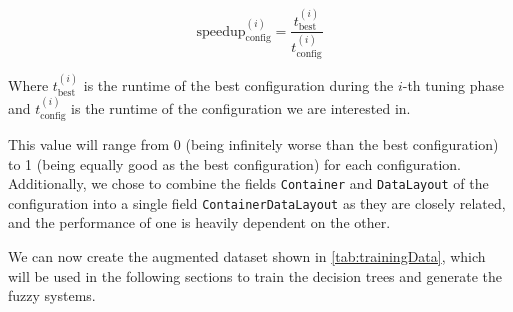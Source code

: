 \begin{equation}
    {\text{speedup}^{(i)}_{\text{config}}}= \frac{t_{\text{best}}^{(i)}}{t_{\text{config}}^{(i)}}
\end{equation}

Where $t_{\text{best}}^{(i)}$ is the runtime of the best configuration during the $i$-th tuning phase and $t_{\text{config}}^{(i)}$ is the runtime of the configuration we are interested in.

This value will range from 0 (being infinitely worse than the best configuration) to 1 (being equally good as the best configuration) for each configuration. Additionally, we chose to combine the fields \texttt{Container} and \texttt{DataLayout} of the configuration into a single field \texttt{ContainerDataLayout} as they are closely related, and the performance of one is heavily dependent on the other.

We can now create the augmented dataset shown in \autoref{tab:trainingData}, which will be used in the following sections to train the decision trees and generate the fuzzy systems.


